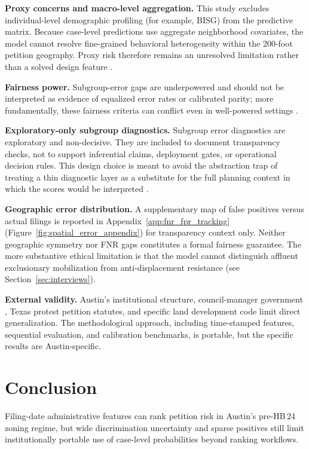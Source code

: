 \documentclass[11pt, letterpaper]{article}
\begin{document}
\textbf{Proxy concerns and macro-level aggregation.} This study excludes individual-level demographic profiling (for example, BISG) from the predictive matrix. Because case-level predictions use aggregate neighborhood covariates, the model cannot resolve fine-grained behavioral heterogeneity within the 200-foot petition geography. Proxy risk therefore remains an unresolved limitation rather than a solved design feature \cite{barocas2016,benjamin2019race,obermeyer2019racial}.

\textbf{Fairness power.} Subgroup-error gaps are underpowered and should not be interpreted as evidence of equalized error rates or calibrated parity; more fundamentally, these fairness criteria can conflict even in well-powered settings \cite{chouldechova2017fair}.

\textbf{Exploratory-only subgroup diagnostics.} Subgroup error diagnostics are exploratory and non-decisive. They are included to document transparency checks, not to support inferential claims, deployment gates, or operational decision rules. This design choice is meant to avoid the abstraction trap of treating a thin diagnostic layer as a substitute for the full planning context in which the scores would be interpreted \cite{selbst2019fairness}.

\textbf{Geographic error distribution.} A supplementary map of false positives versus actual filings is reported in Appendix~\ref{app:fnr_fpr_tracking} (Figure~\ref{fig:spatial_error_appendix}) for transparency context only. Neither geographic symmetry nor FNR gaps constitutes a formal fairness guarantee. The more substantive ethical limitation is that the model cannot distinguish affluent exclusionary mobilization from anti-displacement resistance (see Section~\ref{sec:interviews}).

\textbf{External validity.} Austin's institutional structure, council-manager government \cite{cityaustin2010}, Texas protest petition statutes, and specific land development code limit direct generalization. The methodological approach, including time-stamped features, sequential evaluation, and calibration benchmarks, is portable, but the specific results are Austin-specific.

\section{Conclusion}

Filing-date administrative features can rank petition risk in Austin's pre-HB\,24 zoning regime, but wide discrimination uncertainty and sparse positives still limit institutionally portable use of case-level probabilities beyond ranking workflows.
\end{document}
